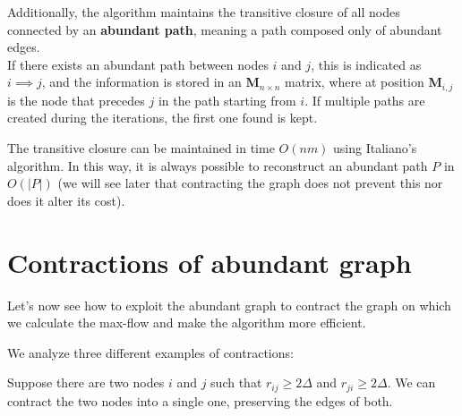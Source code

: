     Additionally, the algorithm maintains the transitive closure of all nodes connected by an \textbf{abundant path}, meaning a path composed only of abundant edges.\\
    If there exists an abundant path between nodes \( i \) and \( j \), this is indicated as \( i \implies j \), and the information is stored in an \textbf{M}$_{n \times n}$ matrix, where at position \textbf{M}$_{i,j}$ is the node that precedes \( j \) in the path starting from \( i \). If multiple paths are created during the iterations, the first one found is kept.

    The transitive closure can be maintained in time \( O(nm) \) using Italiano's algorithm. 
    In this way, it is always possible to reconstruct an abundant path \( P \) in \( O(|P|) \) (we will see later that contracting the graph does not prevent this nor does it alter its cost).

\newpage
\section{Contractions of abundant graph}
Let's now see how to exploit the abundant graph to contract the graph on which we calculate the max-flow and make the algorithm more efficient.

We analyze three different examples of contractions:

Suppose there are two nodes \(i\) and \(j\) such that \(r_{ij} \geq 2\Delta\) and \(r_{ji} \geq 2\Delta\).
We can contract the two nodes into a single one, preserving the edges of both.


